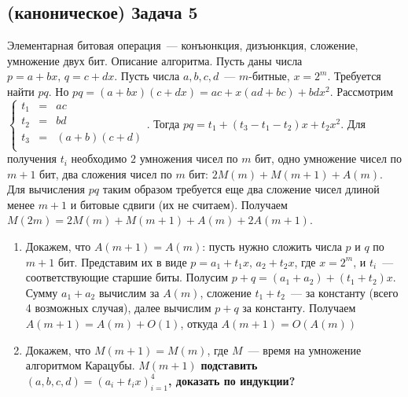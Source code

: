 \documentclass[a4paper]{article}
\begin{document}
\subsection*{(каноническое) Задача 5}
Элементарная битовая операция~--- конъюнкция, дизъюнкция, сложение, умножение двух бит.\newline
Описание алгоритма. Пусть даны числа $p=a+bx,\,q=c+dx$. Пусть числа $a,b,c,d$~--- $m$-битные, $x=2^m$. Требуется найти $pq$. Но $pq=(a+bx)(c+dx)=ac+x(ad+bc)+bdx^2$. Рассмотрим $\left\{\begin{array}{lll}
t_1 & = & ac\\
t_2 & = & bd\\
t_3 & = & (a+b)(c+d)\\
\end{array}\right.$. Тогда $pq=t_1+(t_3-t_1-t_2)x+t_2x^2$. Для получения $t_i$ необходимо $2$ умножения чисел по $m$ бит, одно умножение чисел по $m+1$ бит, два сложения чисел по $m$ бит: $2M(m)+M(m+1)+A(m)$. Для вычисления $pq$ таким образом требуется еще два сложение чисел длиной менее $m+1$ и битовые сдвиги (их не считаем). Получаем $M(2m)=2M(m)+M(m+1)+A(m)+2A(m+1)$.
\begin{enumerate}
\item Докажем, что $A(m+1)=A(m)$: пусть нужно сложить числа $p$ и $q$ по $m+1$ бит. Представим их в виде $p=a_1+t_1x,\,a_2+t_2x$, где $x=2^m$, и $t_i$~--- соответствующие старшие биты. Полусим $p+q=(a_1+a_2)+(t_1+t_2)x$. Сумму $a_1+a_2$ вычислим за $A(m)$, сложение $t_1+t_2$~--- за константу (всего 4 возможных случая), далее вычислим $p+q$ за константу. Получаем $A(m+1)=A(m)+O(1)$, откуда $A(m+1)=O(A(m))$
\item Докажем, что $M(m+1)=M(m)$, где $M$~--- время на умножение алгоритмом Карацубы. $M(m+1)$\newline
{\bf подставить $(a,b,c,d)=(a_i+t_ix)_{i=1}^4$, доказать по индукции?}
\end{enumerate}
\end{document}
